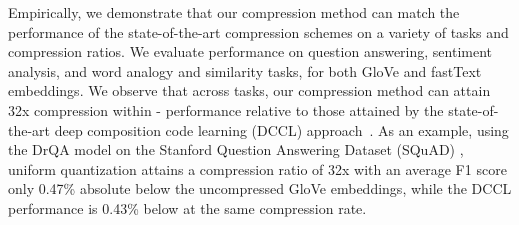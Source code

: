 





Empirically, we demonstrate that our compression method can match the performance of the state-of-the-art compression schemes on a variety of tasks and compression ratios.
We evaluate performance on question answering, sentiment analysis, and word analogy and similarity tasks, for both GloVe \citep{glove14} and fastText \citep{fasttext18} embeddings.
We observe that across tasks, our compression method can attain 32x compression within - performance relative to those attained by the state-of-the-art deep composition code learning (DCCL) approach~\citep{dccl17}.
As an example, using the DrQA model \citep{drqa17} on the Stanford Question Answering Dataset (SQuAD) \citep{squad16}, uniform quantization attains a compression ratio of 32x with an average F1 score only 0.47\% absolute below the uncompressed GloVe embeddings, while the DCCL performance is 0.43\% below at the same compression rate.

